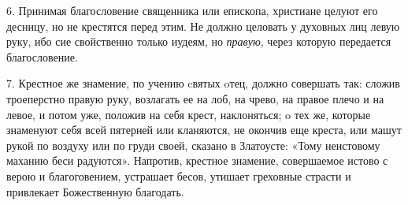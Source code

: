 \begin{mymulticols}
6. Принимая благословение священника или епископа, христиане целуют его десницу, но не крестятся перед этим. Не должно целовать у духовных лиц левую руку, ибо сие свойственно только иудеям, но \emph{ правую}, через которую передается благословение. 



7. Крестное же знамение, по учению cвятых oтец, должно совершать так: сложив троеперстно правую руку, возлагать ее на лоб, на чрево, на правое плечо и на левое, и потом уже, положив на себя крест, наклоняться;  o тех же, которые знаменуют себя всей пятерней или кланяются, не окончив еще креста, или машут рукой по воздуху или по груди своей, сказано в Златоусте: «Тому неистовому маханию беси радуются». Напротив, крестное знамение, совершаемое истово с верою и благоговением, устрашает бесов, утишает греховные страсти и привлекает Божественную благодать. 

\end{mymulticols}


\mychapterending

 
